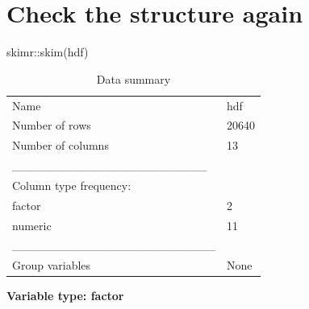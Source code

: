 \documentclass[
  letterpaper,
  DIV=11,
  numbers=noendperiod]{scrreprt}
\newenvironment{Shaded}{\begin{snugshade}}{\end{snugshade}}
\newcommand{\FunctionTok}[1]{\textcolor[rgb]{0.28,0.35,0.67}{#1}}
\newcommand{\NormalTok}[1]{\textcolor[rgb]{0.00,0.23,0.31}{#1}}
\newcommand{\SpecialCharTok}[1]{\textcolor[rgb]{0.37,0.37,0.37}{#1}}
\begin{document}
\section{Check the structure again}\label{check-the-structure-again}

\begin{Shaded}
\begin{Highlighting}[]
\NormalTok{skimr}\SpecialCharTok{::}\FunctionTok{skim}\NormalTok{(hdf)}
\end{Highlighting}
\end{Shaded}

\begin{longtable}[]{@{}ll@{}}
\caption{Data summary}\tabularnewline
\toprule\noalign{}
\endfirsthead
\endhead
\bottomrule\noalign{}
\endlastfoot
Name & hdf \\
Number of rows & 20640 \\
Number of columns & 13 \\
\_\_\_\_\_\_\_\_\_\_\_\_\_\_\_\_\_\_\_\_\_\_\_ & \\
Column type frequency: & \\
factor & 2 \\
numeric & 11 \\
\_\_\_\_\_\_\_\_\_\_\_\_\_\_\_\_\_\_\_\_\_\_\_\_ & \\
Group variables & None \\
\end{longtable}

\textbf{Variable type: factor}
\end{document}
